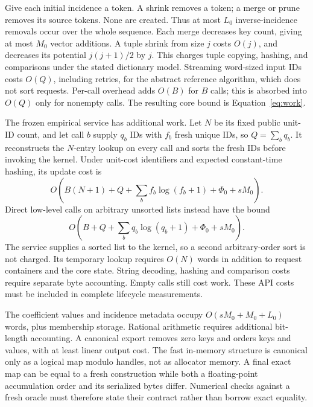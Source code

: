 Give each initial incidence a token. A shrink removes a token; a merge
or prune removes its source tokens. None are created. Thus at most $L_0$
inverse-incidence removals occur over the whole sequence.
Each merge decreases key count, giving at most $M_0$ vector additions.
A tuple shrink from size $j$ costs $O(j)$, and decreases its potential
$j(j+1)/2$ by $j$. This charges tuple copying, hashing, and comparisons
under the stated dictionary model. Streaming word-sized input IDs costs
$O(Q)$, including retries, for the abstract reference algorithm, which
does not sort requests. Per-call overhead adds $O(B)$ for $B$ calls; this
is absorbed into $O(Q)$ only for nonempty calls. The resulting core bound
is Equation~\eqref{eq:work}.

The frozen empirical service has additional work. Let $N$ be its fixed
public unit-ID count, and let call $b$ supply $q_b$ IDs with $f_b$ fresh
unique IDs, so $Q=\sum_b q_b$. It reconstructs the $N$-entry lookup on
every call and sorts the fresh IDs before invoking the kernel. Under
unit-cost identifiers and expected constant-time hashing, its update cost is
\[
 O\!\left(B(N+1)+Q+\sum_b f_b\log(f_b+1)+\Phi_0+sM_0\right).
\]
Direct low-level calls on arbitrary unsorted lists instead have the bound
\[
 O\!\left(B+Q+\sum_b q_b\log(q_b+1)+\Phi_0+sM_0\right).
\]
The service supplies a sorted list to the kernel, so a second arbitrary-order
sort is not charged. Its temporary lookup requires $O(N)$ words in addition
to request containers and the core state. String decoding, hashing and
comparison costs require separate byte accounting. Empty calls still cost
work. These API costs must be included in complete lifecycle measurements.

The coefficient values and incidence metadata occupy
$O(sM_0+M_0+L_0)$ words, plus membership storage. Rational arithmetic
requires additional bit-length accounting. A canonical export removes
zero keys and orders keys and values, with at least linear output cost.
The fast in-memory structure is canonical only as a logical map modulo
handles, not as allocator memory. A final exact map can be equal to a
fresh construction while both a floating-point accumulation order and
its serialized bytes differ. Numerical checks against a fresh oracle
must therefore state their contract rather than borrow exact equality.

